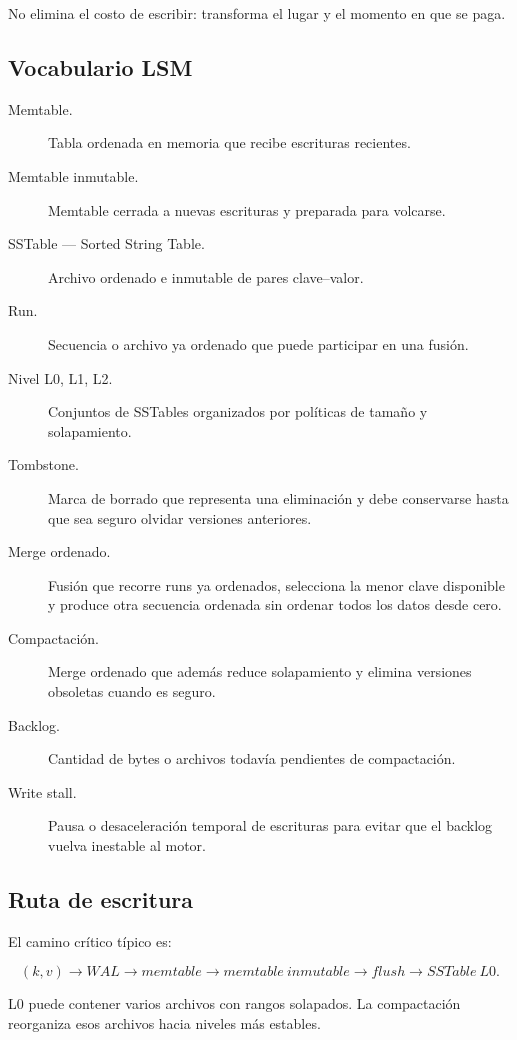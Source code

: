 \documentclass[variant=apuntes,cover=institutional,mode=screen]{ua-engineering-v6-article}
\begin{document}
No elimina el costo de escribir: transforma el lugar y el momento en que se paga.

\subsection{Vocabulario LSM}

\begin{description}
\item[Memtable.] Tabla ordenada en memoria que recibe escrituras recientes.
\item[Memtable inmutable.] Memtable cerrada a nuevas escrituras y preparada para volcarse.
\item[SSTable --- Sorted String Table.] Archivo ordenado e inmutable de pares clave--valor.
\item[Run.] Secuencia o archivo ya ordenado que puede participar en una fusión.
\item[Nivel L0, L1, L2.] Conjuntos de SSTables organizados por políticas de tamaño y solapamiento.
\item[Tombstone.] Marca de borrado que representa una eliminación y debe conservarse hasta que sea seguro olvidar versiones anteriores.
\item[Merge ordenado.] Fusión que recorre runs ya ordenados, selecciona la menor clave disponible y produce otra secuencia ordenada sin ordenar todos los datos desde cero.
\item[Compactación.] Merge ordenado que además reduce solapamiento y elimina versiones obsoletas cuando es seguro.
\item[Backlog.] Cantidad de bytes o archivos todavía pendientes de compactación.
\item[Write stall.] Pausa o desaceleración temporal de escrituras para evitar que el backlog vuelva inestable al motor.
\end{description}

\subsection{Ruta de escritura}

El camino crítico típico es:

\[
(k,v) \rightarrow WAL \rightarrow memtable \rightarrow memtable\ inmutable
\rightarrow flush \rightarrow SSTable\ L0.
\]

L0 puede contener varios archivos con rangos solapados. La compactación reorganiza esos archivos hacia niveles más estables.
\end{document}
